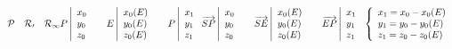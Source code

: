 \documentclass{article}
\begin{document}
\begin{math}
$$\cal{P}\ \ \ \cal{R}_0 \ \ \ \cal{R}_1
$$
$$
\\
\\
P
\left\vert
\begin{array}{l}
x_0\\y_0\\z_0\\
\end{array}
\right.
\ \ \ \
E
\left\vert
\begin{array}{l}
x_0(E)\\y_0(E)\\z_0(E)\\
\end{array}
\right.
\ \ \ \
P
\left\vert
\begin{array}{l}
x_1\\y_1\\z_1\\
\end{array}
\right.
\\\\
\\\\
\overrightarrow{SP}
\left\vert
\begin{array}{l}
x_0\\y_0\\z_0\\
\end{array}
\right.
\ \ \ \
\overrightarrow{SE}
\left\vert
\begin{array}{l}
x_0(E)\\y_0(E)\\z_0(E)\\
\end{array}
\right.
\ \ \ \
\overrightarrow{EP}
\left\vert
\begin{array}{l}
x_1\\y_1\\z_1\\
\end{array}
\right.
\\\\
\\\\
\left\lbrace
\begin{array}{l}
x_1=x_0-x_0(E)\\
y_1=y_0-y_0(E)\\
z_1=z_0-z_0(E)\\
\end{array}
\right.
\\\\
$$
\end{math}
\end{document}
